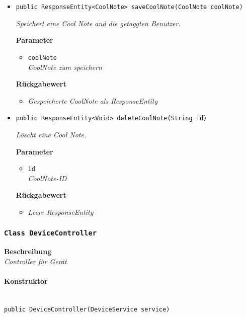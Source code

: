 \begin{itemize}
     \item{\texttt{public ResponseEntity<CoolNote> saveCoolNote(CoolNote coolNote)}}
     	
     	\textit{Speichert eine Cool Note and die getaggten Benutzer.}
     	
     	\textbf{Parameter}
     	\begin{itemize}
     		\item\texttt{coolNote}\\
     		\textit{CoolNote zum speichern} 
     	\end{itemize}
     	
     	\textbf{Rückgabewert}
     	\begin{itemize}
     		\item\textit{Gespeicherte CoolNote als ResponseEntity}
     	\end{itemize}
          	        
     \item{\texttt{public ResponseEntity<Void> deleteCoolNote(String id)}}
     	
     	\textit{Löscht eine Cool Note.}
     	
     	\textbf{Parameter}
     	\begin{itemize}
     		\item\texttt{id}\\
     		\textit{CoolNote-ID}
     	\end{itemize}
     	
     	\textbf{Rückgabewert}
     	\begin{itemize}
     		\item\textit{Leere ResponseEntity}
     	\end{itemize}
     \end{itemize}
 
     \subsubsection{\texttt{Class DeviceController}}
     \textbf{Beschreibung} \\
     \textit{Controller für Gerät}
     \paragraph*{Konstruktor}\mbox{} \\
     \texttt{public DeviceController(DeviceService service)}
